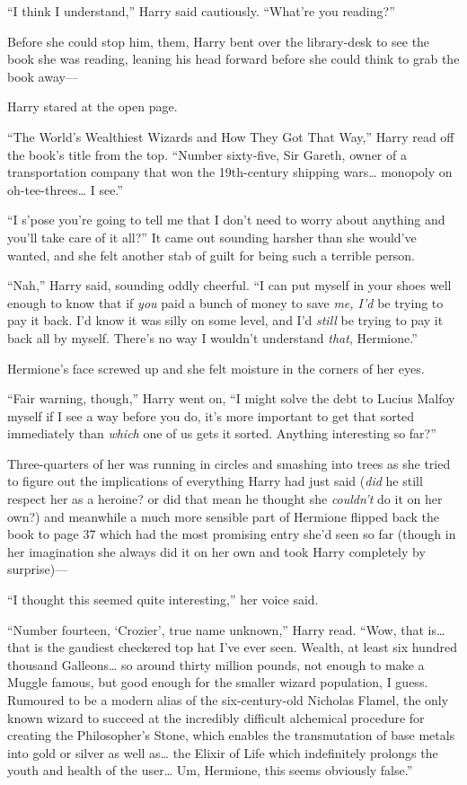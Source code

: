 ``I think I understand,'' Harry said cautiously. ``What're you
reading?''

Before she could stop him, them, Harry bent over the library-desk to see
the book she was reading, leaning his head forward before she could
think to grab the book away---

Harry stared at the open page.

``The World's Wealthiest Wizards and How They Got That Way,'' Harry read
off the book's title from the top. ``Number sixty-five, Sir Gareth,
owner of a transportation company that won the 19th-century shipping
wars\ldots{} monopoly on oh-tee-threes\ldots{} I see.''

``I s'pose you're going to tell me that I don't need to worry about
anything and you'll take care of it all?'' It came out sounding harsher
than she would've wanted, and she felt another stab of guilt for being
such a terrible person.

``Nah,'' Harry said, sounding oddly cheerful. ``I can put myself in your
shoes well enough to know that if \emph{you} paid a bunch of money to
save \emph{me, I'd} be trying to pay it back. I'd know it was silly on
some level, and I'd \emph{still} be trying to pay it back all by myself.
There's no way I wouldn't understand \emph{that}, Hermione.''

Hermione's face screwed up and she felt moisture in the corners of her
eyes.

``Fair warning, though,'' Harry went on, ``I might solve the debt to
Lucius Malfoy myself if I see a way before you do, it's more important
to get that sorted immediately than \emph{which} one of us gets it
sorted. Anything interesting so far?''

Three-quarters of her was running in circles and smashing into trees as
she tried to figure out the implications of everything Harry had just
said (\emph{did} he still respect her as a heroine? or did that mean he
thought she \emph{couldn't} do it on her own?) and meanwhile a much more
sensible part of Hermione flipped back the book to page 37 which had the
most promising entry she'd seen so far (though in her imagination she
always did it on her own and took Harry completely by surprise)---

``I thought this seemed quite interesting,'' her voice said.

``Number fourteen, `Crozier', true name unknown,'' Harry read. ``Wow,
that is\ldots{} that is the gaudiest checkered top hat I've ever seen.
Wealth, at least six hundred thousand Galleons\ldots{} so around thirty
million pounds, not enough to make a Muggle famous, but good enough for
the smaller wizard population, I guess. Rumoured to be a modern alias of
the six-century-old Nicholas Flamel, the only known wizard to succeed at
the incredibly difficult alchemical procedure for creating the
Philosopher's Stone, which enables the transmutation of base metals into
gold or silver as well as\ldots{} the Elixir of Life which indefinitely
prolongs the youth and health of the user\ldots{} Um, Hermione, this
seems obviously false.''

